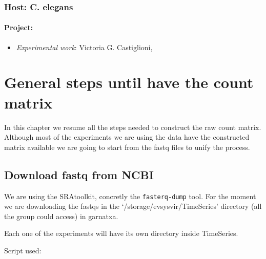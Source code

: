 \documentclass[
]{book}
\providecommand{\tightlist}{%
  \setlength{\itemsep}{0pt}\setlength{\parskip}{0pt}}
\begin{document}
\hypertarget{host-c.-elegans}{%
\subsection{Host: C. elegans}\label{host-c.-elegans}}

\hypertarget{project}{%
\subsubsection{Project:}\label{project}}

\begin{itemize}
\tightlist
\item
  \emph{Experimental work}: Victoria G. Castiglioni,
\end{itemize}

\hypertarget{previous-steps}{%
\chapter{General steps until have the count matrix}\label{previous-steps}}

In this chapter we resume all the steps needed to construct the raw count matrix.
Although most of the experiments we are using the data have the constructed matrix available we are going to start from the fastq files to unify the process.

\hypertarget{download-fastq-from-ncbi}{%
\section{Download fastq from NCBI}\label{download-fastq-from-ncbi}}

We are using the SRAtoolkit, concretly the \texttt{fasterq-dump} tool. For the moment we are downloading the fastqs in the `/storage/evsysvir/TimeSeries' directory (all the group could access) in garnatxa.

Each one of the experiments will have its own directory inside TimeSeries.

Script used:
\end{document}
